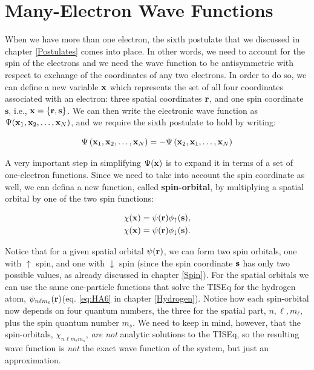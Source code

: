 \documentclass[
  9pt,
]{extbook}
\theoremstyle{definition}
\theoremstyle{definition}
\theoremstyle{definition}
\theoremstyle{remark}
\begin{document}
\hypertarget{many-electron-wave-functions}{%
\section{Many-Electron Wave Functions}\label{many-electron-wave-functions}}

When we have more than one electron, the sixth postulate that we discussed in chapter \ref{Postulates} comes into place. In other words, we need to account for the spin of the electrons and we need the wave function to be antisymmetric with respect to exchange of the coordinates of any two electrons. In order to do so, we can define a new variable \({\bf x}\) which represents the set of all four coordinates associated with an electron: three spatial coordinates \({\bf r}\), and one spin coordinate \(\mathbf{s}\), i.e., \({\bf x} = \{ {\bf r}, {\bf s} \}\). We can then write the electronic wave function as \(\Psi({\bf x}_1, {\bf x}_2, \ldots, {\bf x}_N)\), and we require the sixth postulate to hold by writing:

\begin{equation}
\Psi\left({\bf x}_1,{\bf x}_2,\ldots, {\bf x}_N\right) = - \Psi\left({\bf x}_2,{\bf x}_1,\ldots, {\bf x}_N\right)
\label{eq:atom2}  
\end{equation}

A very important step in simplifying \(\Psi({\bf x})\) is to expand it in terms of a set of one-electron functions. Since we need to take into account the spin coordinate as well, we can defina a new function, called \textbf{spin-orbital}, by multiplying a spatial orbital by one of the two spin functions:

\begin{equation}
\begin{aligned}
\chi({\bf x}) &= \psi({\bf r}) \phi_{\uparrow}({\bf s}), \\
\chi({\bf x}) &= \psi({\bf r}) \phi_{\downarrow}({\bf s}).
\end{aligned}
\label{eq:atom3}
\end{equation}

Notice that for a given spatial orbital \(\psi({\bf r})\), we can form two spin orbitals, one with \(\uparrow\) spin, and one with \(\downarrow\) spin (since the spin coordinate \({\bf s}\) has only two possible values, as already discussed in chapter \ref{Spin}). For the spatial orbitals we can use the same one-particle functions that solve the TISEq for the hydrogen atom, \(\psi_{n\ell m_{\ell}}({\bf r})\)(eq. \eqref{eq:HA6} in chapter \ref{Hydrogen}). Notice how each spin-orbital now depends on four quantum numbers, the three for the spatial part, \(n,\ell,m_{\ell}\), plus the spin quantum number \(m_s\). We need to keep in mind, however, that the spin-orbitals, \(\chi_{n\ell m_{\ell} m_{s}}\), \emph{are not} analytic solutions to the TISEq, so the resulting wave function is \emph{not} the exact wave function of the system, but just an approximation.
\end{document}
